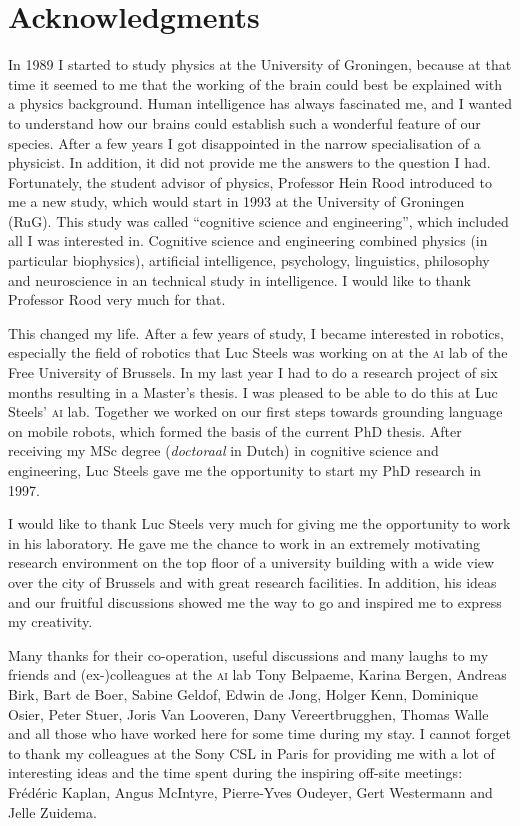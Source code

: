 \chapter*{Acknowledgments}

In 1989 I started to study physics at the University of Groningen, because at that time it seemed to me that the working of the brain could best be explained with a physics background. Human intelligence has always fascinated me, and I wanted to understand how our brains could establish such a wonderful feature of our species. After a few years I got disappointed in the narrow specialisation of a physicist. In addition, it did not provide me the answers to the question I had. Fortunately, the student advisor of physics, Professor Hein Rood introduced to me a new study, which would start in 1993 at the University of Groningen (RuG). This study was called ``cognitive science and engineering'', which included all I was interested in. Cognitive science and engineering combined physics (in particular biophysics), artificial intelligence, psychology, linguistics, philosophy and neuroscience in an technical study in intelligence. I would like to thank Professor Rood very much for that.

This changed my life. After a few years of study, I became interested in robotics, especially the field of robotics that Luc Steels was working on at the {\scshape ai} lab of the Free University of Brussels. In my last year I had to do a research project of six months resulting in a Master's thesis. I was pleased to be able to do this at Luc Steels' {\scshape ai} lab. Together we worked on our first steps towards grounding language on mobile robots, which formed the basis of the current PhD thesis. After receiving my MSc degree (\textit{doctoraal} in Dutch) in cognitive science and engineering, Luc Steels gave me the opportunity to start my PhD research in 1997.

I would like to thank Luc Steels very much for giving me the opportunity to work in his laboratory. He gave me the chance to work in an extremely motivating research environment on the top floor of a university building with a wide view over the city of Brussels and with great research facilities. In addition, his ideas and our fruitful discussions showed me the way to go and inspired me to express my creativity.

Many thanks for their co-operation, useful discussions and many laughs to my friends and (ex-)colleagues at the {\scshape ai} lab Tony Belpaeme, Karina Bergen, Andreas Birk, Bart de Boer, Sabine Geldof, Edwin de Jong, Holger Kenn, Dominique Osier, Peter Stuer, Joris Van Looveren, Dany Vereertbrugghen, Thomas Walle and all those who have worked here for some time during my stay. I cannot forget to thank my colleagues at the Sony CSL in Paris for providing me with a lot of interesting ideas and the time spent during the inspiring off-site meetings: Fr\'ed\'eric Kaplan, Angus McIntyre, Pierre-Yves Oudeyer, Gert Westermann and Jelle Zuidema.

